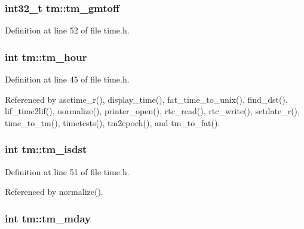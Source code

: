 \subsubsection[{\texorpdfstring{tm\+\_\+gmtoff}{tm_gmtoff}}]{\setlength{\rightskip}{0pt plus 5cm}int32\+\_\+t tm\+::tm\+\_\+gmtoff}\hypertarget{structtm_a6b7d1fb16f21197ea027e364e2812c3d}{}\label{structtm_a6b7d1fb16f21197ea027e364e2812c3d}


Definition at line 52 of file time.\+h.

\subsubsection[{\texorpdfstring{tm\+\_\+hour}{tm_hour}}]{\setlength{\rightskip}{0pt plus 5cm}int tm\+::tm\+\_\+hour}\hypertarget{structtm_a3e7ca4e37f1abcaf56b8a916c38eb9fe}{}\label{structtm_a3e7ca4e37f1abcaf56b8a916c38eb9fe}


Definition at line 45 of file time.\+h.



Referenced by asctime\+\_\+r(), display\+\_\+time(), fat\+\_\+time\+\_\+to\+\_\+unix(), find\+\_\+dst(), lif\+\_\+time2lif(), normalize(), printer\+\_\+open(), rtc\+\_\+read(), rtc\+\_\+write(), setdate\+\_\+r(), time\+\_\+to\+\_\+tm(), timetests(), tm2epoch(), and tm\+\_\+to\+\_\+fat().

\subsubsection[{\texorpdfstring{tm\+\_\+isdst}{tm_isdst}}]{\setlength{\rightskip}{0pt plus 5cm}int tm\+::tm\+\_\+isdst}\hypertarget{structtm_a5645ca0580c8ab2c24f6c2965d9c9f9c}{}\label{structtm_a5645ca0580c8ab2c24f6c2965d9c9f9c}


Definition at line 51 of file time.\+h.



Referenced by normalize().

\subsubsection[{\texorpdfstring{tm\+\_\+mday}{tm_mday}}]{\setlength{\rightskip}{0pt plus 5cm}int tm\+::tm\+\_\+mday}\hypertarget{structtm_ab8d8904bad43b0c8b96e61941c5b5310}{}\label{structtm_ab8d8904bad43b0c8b96e61941c5b5310}


